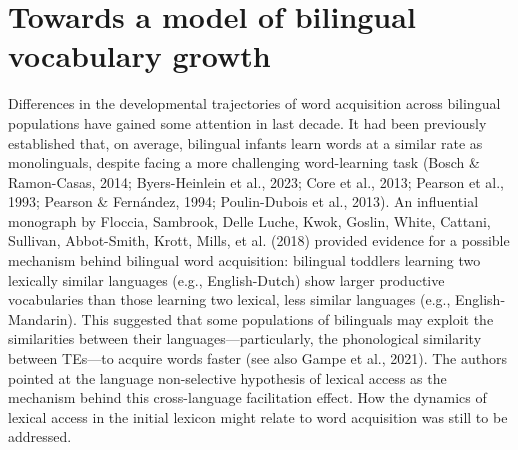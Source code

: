 \documentclass[
  12pt,
  b5paperpaper,
  twoside]{scrreprt}
\begin{document}
\hypertarget{towards-a-model-of-bilingual-vocabulary-growth}{%
\section{Towards a model of bilingual vocabulary
growth}\label{towards-a-model-of-bilingual-vocabulary-growth}}

Differences in the developmental trajectories of word acquisition across
bilingual populations have gained some attention in last decade. It had
been previously established that, on average, bilingual infants learn
words at a similar rate as monolinguals, despite facing a more
challenging word-learning task (Bosch \& Ramon-Casas, 2014;
Byers-Heinlein et al., 2023; Core et al., 2013; Pearson et al., 1993;
Pearson \& Fernández, 1994; Poulin-Dubois et al., 2013). An influential
monograph by Floccia, Sambrook, Delle Luche, Kwok, Goslin, White,
Cattani, Sullivan, Abbot-Smith, Krott, Mills, et al. (2018) provided
evidence for a possible mechanism behind bilingual word acquisition:
bilingual toddlers learning two lexically similar languages (e.g.,
English-Dutch) show larger productive vocabularies than those learning
two lexical, less similar languages (e.g., English-Mandarin). This
suggested that some populations of bilinguals may exploit the
similarities between their languages---particularly, the phonological
similarity between TEs---to acquire words faster (see also Gampe et al.,
2021). The authors pointed at the language non-selective hypothesis of
lexical access as the mechanism behind this cross-language facilitation
effect. How the dynamics of lexical access in the initial lexicon might
relate to word acquisition was still to be addressed.
\end{document}
